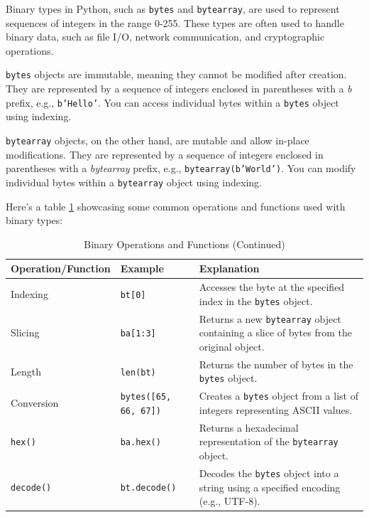 \documentclass[12pt]{book}
\begin{document}
Binary types in Python, such as \texttt{bytes} and \texttt{bytearray}, are used to represent sequences of integers in the range 0-255. These types are often used to handle binary data, such as file I/O, network communication, and cryptographic operations.

\texttt{bytes} objects are immutable, meaning they cannot be modified after creation. They are represented by a sequence of integers enclosed in parentheses with a \textit{b} prefix, e.g., \texttt{b'Hello'}. You can access individual bytes within a \texttt{bytes} object using indexing.

\texttt{bytearray} objects, on the other hand, are mutable and allow in-place modifications. They are represented by a sequence of integers enclosed in parentheses with a \textit{bytearray} prefix, e.g., \texttt{bytearray(b'World')}. You can modify individual bytes within a \texttt{bytearray} object using indexing.

Here's a table \ref{tab:binary-operations} showcasing some common operations and functions used with binary types:

\begin{table}[h]
\centering
\caption{Binary Operations and Functions (Continued)}
\label{tab:binary-operations}
\begin{tabular}{|l|l|p{7cm}|}
\hline
\textbf{Operation/Function} & \textbf{Example} & \textbf{Explanation} \\
\hline
Indexing & \texttt{bt[0]} & Accesses the byte at the specified index in the \texttt{bytes} object. \\
\hline
Slicing & \texttt{ba[1:3]} & Returns a new \texttt{bytearray} object containing a slice of bytes from the original object. \\
\hline
Length & \texttt{len(bt)} & Returns the number of bytes in the \texttt{bytes} object. \\
\hline
Conversion & \texttt{bytes([65, 66, 67])} & Creates a \texttt{bytes} object from a list of integers representing ASCII values. \\
\hline
\texttt{hex()} & \texttt{ba.hex()} & Returns a hexadecimal representation of the \texttt{bytearray} object. \\
\hline
\texttt{decode()} & \texttt{bt.decode()} & Decodes the \texttt{bytes} object into a string using a specified encoding (e.g., UTF-8). \\
\hline
\end{tabular}
\end{table}
\end{document}
